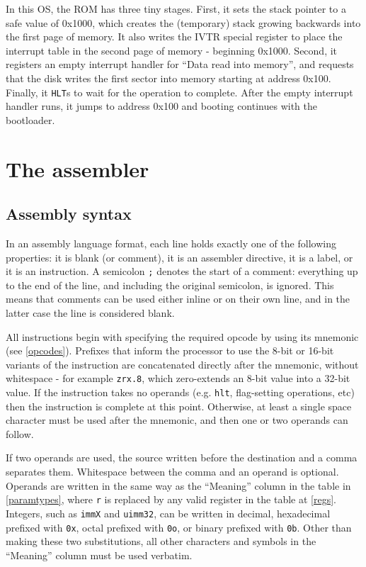 \documentclass[12pt,a4paper]{report}
\begin{document}
In this OS, the ROM has three tiny stages. First, it sets the stack pointer to a safe value of 0x1000, which creates the (temporary) stack growing backwards into the first page of memory. It also writes the IVTR special register to place the interrupt table in the second page of memory - beginning 0x1000. Second, it registers an empty interrupt handler for ``Data read into memory'', and requests that the disk writes the first sector into memory starting at address 0x100. Finally, it \texttt{HLT}s to wait for the operation to complete. After the empty interrupt handler runs, it jumps to address 0x100 and booting continues with the bootloader.


\section{The assembler}

\subsection*{Assembly syntax}

In an assembly language format, each line holds exactly one of the following properties: it is blank (or comment), it is an assembler directive, it is a label, or it is an instruction. A semicolon \texttt{;} denotes the start of a comment: everything up to the end of the line, and including the original semicolon, is ignored. This means that comments can be used either inline or on their own line, and in the latter case the line is considered blank.

All instructions begin with specifying the required opcode by using its mnemonic (see \autoref{opcodes}). Prefixes that inform the processor to use the 8-bit or 16-bit variants of the instruction are concatenated directly after the mnemonic, without whitespace - for example \texttt{zrx.8}, which zero-extends an 8-bit value into a 32-bit value. If the instruction takes no operands (e.g. \texttt{hlt}, flag-setting operations, etc) then the instruction is complete at this point. Otherwise, at least a single space character must be used after the mnemonic, and then one or two operands can follow.

If two operands are used, the source written before the destination and a comma separates them. Whitespace between the comma and an operand is optional. Operands are written in the same way as the ``Meaning'' column in the table in \autoref{paramtypes}, where \texttt{r} is replaced by any valid register in the table at \autoref{regs}. Integers, such as \texttt{immX} and \texttt{uimm32}, can be written in decimal, hexadecimal prefixed with \texttt{0x}, octal prefixed with \texttt{0o}, or binary prefixed with \texttt{0b}. Other than making these two substitutions, all other characters and symbols in the ``Meaning'' column must be used verbatim.
\end{document}
